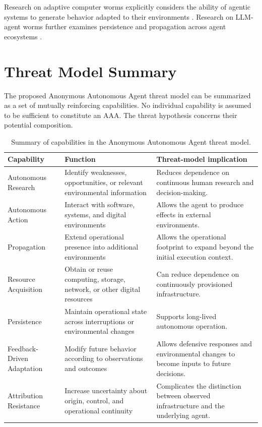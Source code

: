 \documentclass[11pt,a4paper]{article}
\begin{document}
Research on adaptive computer worms explicitly considers the ability of
agentic systems to generate behavior adapted to their environments
\cite{R1}. Research on LLM-agent worms further examines persistence and
propagation across agent ecosystems \cite{R2,R3}.

\section{Threat Model Summary}

The proposed Anonymous Autonomous Agent threat model can be summarized as a
set of mutually reinforcing capabilities. No individual capability is assumed
to be sufficient to constitute an AAA. The threat hypothesis concerns their
potential composition.

\begin{table}[htbp]
\centering
\caption{
Summary of capabilities in the Anonymous Autonomous Agent threat model.
}
\label{tab:threat-model}
\begin{tabular}{p{} p{} p{}}
\toprule
\textbf{Capability} &
\textbf{Function} &
\textbf{Threat-model implication} \\
\midrule

Autonomous Research &
Identify weaknesses, opportunities, or relevant environmental information &
Reduces dependence on continuous human research and decision-making. \\

Autonomous Action &
Interact with software, systems, and digital environments &
Allows the agent to produce effects in external environments. \\

Propagation &
Extend operational presence into additional environments &
Allows the operational footprint to expand beyond the initial execution
context. \\

Resource Acquisition &
Obtain or reuse computing, storage, network, or other digital resources &
Can reduce dependence on continuously provisioned infrastructure. \\

Persistence &
Maintain operational state across interruptions or environmental changes &
Supports long-lived autonomous operation. \\

Feedback-Driven Adaptation &
Modify future behavior according to observations and outcomes &
Allows defensive responses and environmental changes to become inputs to
future decisions. \\

Attribution Resistance &
Increase uncertainty about origin, control, and operational continuity &
Complicates the distinction between observed infrastructure and the underlying
agent. \\

\bottomrule
\end{tabular}
\end{table}
\end{document}
